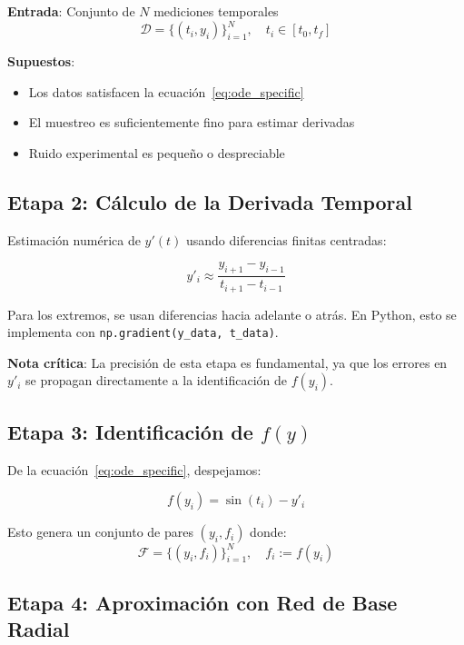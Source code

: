\documentclass[11pt,a4paper]{article}
\begin{document}
\textbf{Entrada}: Conjunto de $N$ mediciones temporales
\begin{equation}
\mathcal{D} = \{(t_i, y_i)\}_{i=1}^{N}, \quad t_i \in [t_0, t_f]
\end{equation}

\textbf{Supuestos}:
\begin{itemize}
    \item Los datos satisfacen la ecuación~\eqref{eq:ode_specific}
    \item El muestreo es suficientemente fino para estimar derivadas
    \item Ruido experimental es pequeño o despreciable
\end{itemize}

\subsection{Etapa 2: Cálculo de la Derivada Temporal}

Estimación numérica de $y'(t)$ usando diferencias finitas centradas:

\begin{equation}
y'_i \approx \frac{y_{i+1} - y_{i-1}}{t_{i+1} - t_{i-1}}
\label{eq:derivative}
\end{equation}

Para los extremos, se usan diferencias hacia adelante o atrás. En Python, esto se implementa con \texttt{np.gradient(y\_data, t\_data)}.

\textbf{Nota crítica}: La precisión de esta etapa es fundamental, ya que los errores en $y'_i$ se propagan directamente a la identificación de $f(y_i)$.

\subsection{Etapa 3: Identificación de $f(y)$}

De la ecuación~\eqref{eq:ode_specific}, despejamos:

\begin{equation}
f(y_i) = \sin(t_i) - y'_i
\label{eq:f_identification}
\end{equation}

Esto genera un conjunto de pares $(y_i, f_i)$ donde:
\begin{equation}
\mathcal{F} = \{(y_i, f_i)\}_{i=1}^{N}, \quad f_i := f(y_i)
\label{eq:training_pairs}
\end{equation}

\subsection{Etapa 4: Aproximación con Red de Base Radial}
\end{document}
